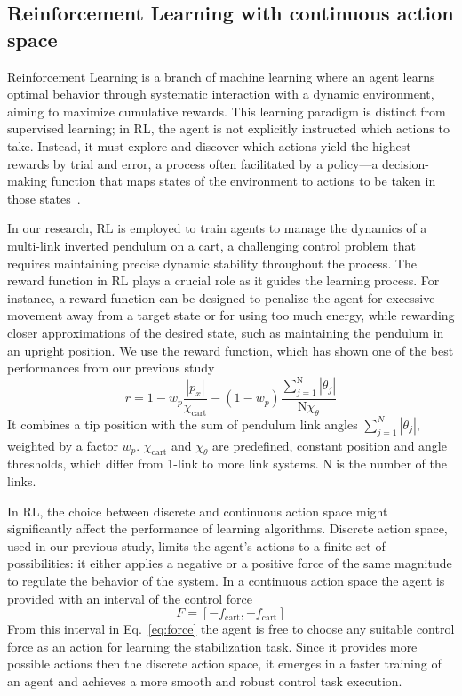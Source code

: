 \subsection{Reinforcement Learning with continuous action space}
Reinforcement Learning is a branch of machine learning where an agent learns optimal behavior through systematic interaction with a dynamic environment, aiming to maximize cumulative rewards. This learning paradigm is distinct from supervised learning; in RL, the agent is not explicitly instructed which actions to take. Instead, it must explore and discover which actions yield the highest rewards by trial and error, a process often facilitated by a policy—a decision-making function that maps states of the environment to actions to be taken in those states~\cite{sutton_reinforcement_2018}.

In our research, RL is employed to train agents to manage the dynamics of a multi-link inverted pendulum on a cart, a challenging control problem that requires maintaining precise dynamic stability throughout the process. The reward function in RL plays a crucial role as it guides the learning process. For instance, a reward function can be designed to penalize the agent for excessive movement away from a target state or for using too much energy, while rewarding closer approximations of the desired state, such as maintaining the pendulum in an upright position. We use the reward function, which has shown one of the best performances from our previous study
\begin{equation}
r = 1 - w_p \frac{\left|p_x\right|}{\chi_\mathrm{cart}} - (1-w_p) \frac{\sum_{j=1}^\mathrm{N} \left|\theta_j\right|}{\mathrm{N} \chi_{\theta}} 
\label{eq:reward}
\end{equation}
It combines a tip position with the sum of pendulum link angles $\sum_{j=1}^{N} \left|\theta_j\right|$, weighted by a factor $w_p$. $\chi_\mathrm{cart}$ and $\chi_{\theta}$ are predefined, constant position and angle thresholds, which differ from 1-link to more link systems. $\mathrm{N}$ is the number of the links.

In RL, the choice between discrete and continuous action space might significantly affect the performance of learning algorithms. Discrete action space, used in our previous study, limits the agent’s actions to a finite set of possibilities: it either applies a negative or a positive force of the same magnitude to regulate the behavior of the system. In a continuous action space the agent is provided with an interval of the control force
\begin{equation}
F = [-f_\mathrm{cart}, +f_\mathrm{cart}]
\label{eq:force}
\end{equation}
From this interval in Eq.~\eqref{eq:force} the agent is free to choose any suitable control force as an action for learning the stabilization task. Since it provides more possible actions then the discrete action space, it emerges in a faster training of an agent and achieves a more smooth and robust control task execution.  

